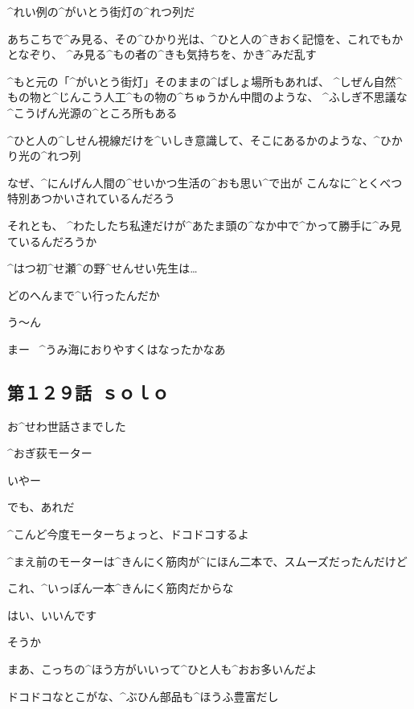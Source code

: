 \Ayase ^{れい}{例}の^{がいとう}{街灯}の^{れつ}{列}だ

\page[127]
\Ayase あちこちで^{み}{見}る、その^{ひかり}{光}は、^{ひと}{人}の^{きおく}{記憶}を、これでもかとなぞり、
^{み}{見}る^{もの}{者}の^{きも}{気持}ちを、かき^{みだ}{乱}す

\Ayase ^{もと}{元}の「^{がいとう}{街灯}」そのままの^{ばしょ}{場所}もあれば、
^{しぜん}{自然}^{もの}{物}と^{じんこう}{人工}^{もの}{物}の^{ちゅうかん}{中間}のような、
^{ふしぎ}{不思議}な^{こうげん}{光源}の^{ところ}{所}もある

\Ayase ^{ひと}{人}の^{しせん}{視線}だけを^{いしき}{意識}して、そこにあるかのような、^{ひかり}{光}の^{れつ}{列}

\page[128]
\Ayase なぜ、^{にんげん}{人間}の^{せいかつ}{生活}の^{おも}{思}い^{で}{出}が
こんなに^{とくべつ}{特別}あつかいされているんだろう

\Ayase それとも、
^{わたしたち}{私達}だけが^{あたま}{頭}の^{なか}{中}で^{かって}{勝手}に^{み}{見}ているんだろうか

\page[129]
\Ayase ^{はつ}{初}^{せ}{瀬}^{の}{野}^{せんせい}{先生}は…

\Ayase どのへんまで^{い}{行}ったんだか

\page[130]
\Alpha う〜ん

\Alpha まー
\ ^{うみ}{海}におりやすくはなったかなあ


\subsection{第１２９話\ ｓｏｌｏ}

\page[132]
\Kokone お^{せわ}{世話}さまでした

\Sign ^{おぎ}{荻}モーター

\Person いやー

\Person でも、あれだ

\Person ^{こんど}{今度}モーターちょっと、ドコドコするよ

\Person ^{まえ}{前}のモーターは^{きんにく}{筋肉}が^{にほん}{二本}で、スムーズだったんだけど

\Person これ、^{いっぽん}{一本}^{きんにく}{筋肉}だからな

\Kokone はい、いいんです

\page[133]
\Person そうか

\Person まあ、こっちの^{ほう}{方}がいいって^{ひと}{人}も^{おお}{多}いんだよ

\Person ドコドコなとこがな、^{ぶひん}{部品}も^{ほうふ}{豊富}だし

